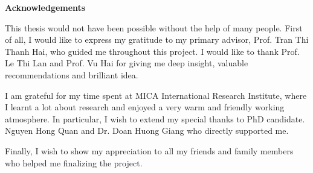 
\cleardoublepage
{}


\begin{center}
\textbf{Acknowledgements}
\end{center}

This thesis would not have been possible without the help of many people.
First of all, I would like to express my gratitude to my primary advisor, Prof. Tran Thi Thanh Hai, who guided me throughout this project.
I would like to thank Prof. Le Thi Lan and Prof. Vu Hai for giving me deep insight, valuable recommendations and brilliant idea.

I am grateful for my time spent at MICA International Research Institute, where I learnt a lot about research and enjoyed a very warm and friendly working atmosphere.
In particular, I wish to extend my special thanks to PhD candidate. Nguyen Hong Quan and Dr. Doan Huong Giang who directly supported me.

Finally, I wish to show my appreciation to all my friends and family members who helped me finalizing the project.
\\\\









